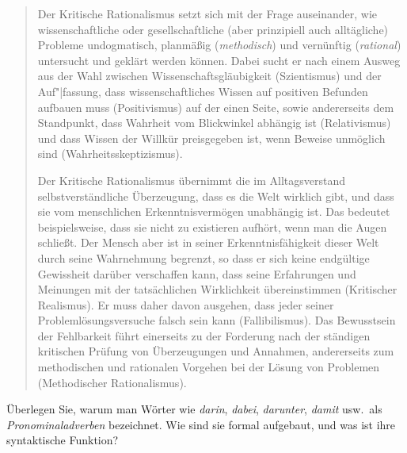 \begin{quote}\small
  Der Kritische Rationalismus setzt sich mit der Frage auseinander, wie wissenschaftliche oder gesellschaftliche (aber prinzipiell auch alltägliche) Probleme undogmatisch, planmäßig (\textit{methodisch}) und vernünftig (\textit{rational}) untersucht und geklärt werden können. Dabei sucht er nach einem Ausweg aus der Wahl zwischen Wissenschaftsgläubigkeit (Szientismus) und der Auf"|fassung, dass wissenschaftliches Wissen auf positiven Befunden aufbauen muss (Positivismus) auf der einen Seite, sowie andererseits dem Standpunkt, dass Wahrheit vom Blickwinkel abhängig ist (Relativismus) und dass Wissen der Willkür preisgegeben ist, wenn Beweise unmöglich sind (Wahrheitsskeptizismus).

Der Kritische Rationalismus übernimmt die im Alltagsverstand selbstverständliche Überzeugung, dass es die Welt wirklich gibt, und dass sie vom menschlichen Erkenntnis­vermögen unabhängig ist. Das bedeutet beispielsweise, dass sie nicht zu existieren aufhört, wenn man die Augen schließt. Der Mensch aber ist in seiner Erkenntnisfähigkeit dieser Welt durch seine Wahrnehmung begrenzt, so dass er sich keine endgültige Gewissheit darüber verschaffen kann, dass seine Erfahrungen und Meinungen mit der tatsächlichen Wirklichkeit übereinstimmen (Kritischer Realismus). Er muss daher davon ausgehen, dass jeder seiner Problemlösungsversuche falsch sein kann (Fallibilismus). Das Bewusstsein der Fehlbarkeit führt einerseits zu der Forderung nach der ständigen kritischen Prüfung von Überzeugungen und Annahmen, andererseits zum methodischen und rationalen Vorgehen bei der Lösung von Problemen (Methodischer Rationalismus).
\end{quote}

\Uebung[\tristar]{} \label{exc:wortklassen07} Überlegen Sie, warum man Wörter wie \textit{darin}, \textit{dabei}, \textit{darunter}, \textit{damit} usw.\ als \textit{Pronominaladverben} bezeichnet.
Wie sind sie formal aufgebaut, und was ist ihre syntaktische Funktion?
